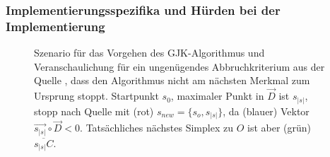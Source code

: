 \subsubsection{Implementierungsspezifika und Hürden bei der Implementierung}
\begin{figure}
	\centering
	\caption{Szenario für das Vorgehen des GJK-Algorithmus und Veranschaulichung für ein ungenügendes Abbruchkriterium aus der Quelle \cite{gjk-casey}, dass den Algorithmus nicht am nächsten Merkmal zum Ursprung stoppt. Startpunkt $s_0$, maximaler Punkt in $\vec{D}$ ist $s_{|s|}$, stopp nach Quelle \cite{gjk-casey} mit (rot) $s_{new} = \{s_o, s_{|s|}\}$, da (blauer) Vektor $\vec{s_{|s|}}\circ\vec{D} < 0$. Tatsächliches nächstes Simplex zu $O$ ist aber (grün) $\overline{s_{|s|}C}$.}
	\label{fig:why_criteria}
\end{figure}

